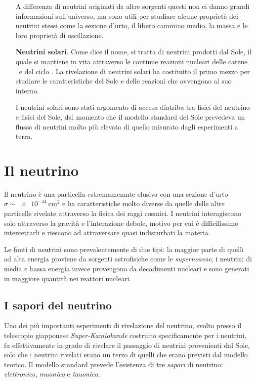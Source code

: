 \begin{enumerate}[wide = 0pt, leftmargin = \parindent]
            A differenza di neutrini originati da altre sorgenti questi non ci danno grandi informazioni sull'universo, ma sono utili per studiare alcune proprietà dei neutrini stessi come la sezione d'urto, il libero cammino medio, la massa e le loro proprietà di oscillazione.

            \item[\textbf{Neutrini solari}.] Come dice il nome, si tratta di neutrini prodotti dal Sole, il quale si mantiene in vita attraverso le continue reazioni nucleari delle catene \proton\proton\ e del ciclo . La rivelazione di neutrini solari ha costituito il primo mezzo per studiare le caratteristiche del Sole e delle reazioni che avvengono al suo interno.
            
            I neutrini solari sono stati argomento di accesa diatriba tra fisici del neutrino e fisici del Sole, dal momento che il modello standard del Sole prevedeva un flusso di neutrini molto più elevato di quello misurato dagli esperimenti a terra.
        \end{enumerate}

    \section{Il neutrino}
        Il neutrino è una particella estremamemnte elusiva con una sezione d'urto $\sigma \sim \SI{e-44}{\centi\meter\squared}$ e ha caratteristiche molto diverse da quelle delle altre particelle rivelate attraverso la fisica dei raggi cosmici. I neutrini interagiscono solo attraverso la gravità e l'interazione debole, motivo per cui è difficilissimo intercettarli e riescono ad attraversare quasi indisturbati la materia.

        Le fonti di neutrini sono prevalentemente di due tipi: la maggior parte di quelli ad alta energia proviene da sorgenti astrofisiche come le \textit{supernoavae}, i neutrini di media e bassa energia invece provengono da decadimenti nucleari e sono generati in maggiore quantità nei reattori nucleari.
        \subsection{I sapori del neutrino}
            Uno dei più importanti esperimenti di rivelazione del neutrino, svolto presso il telescopio giapponese \emph{Super-Kamiokande} costruito specificamente per i neutrini, fu effettivamente in grado di rivelare il passaggio di neutrini provenienti dal Sole, solo che i neutrini rivelati erano un terzo di quelli che erano previsti dal modello teorico.
            Il modello standard prevede l'esistenza di tre \emph{sapori} di neutrino: \emph{elettronico}, \emph{muonico} e \emph{tauonico}.

